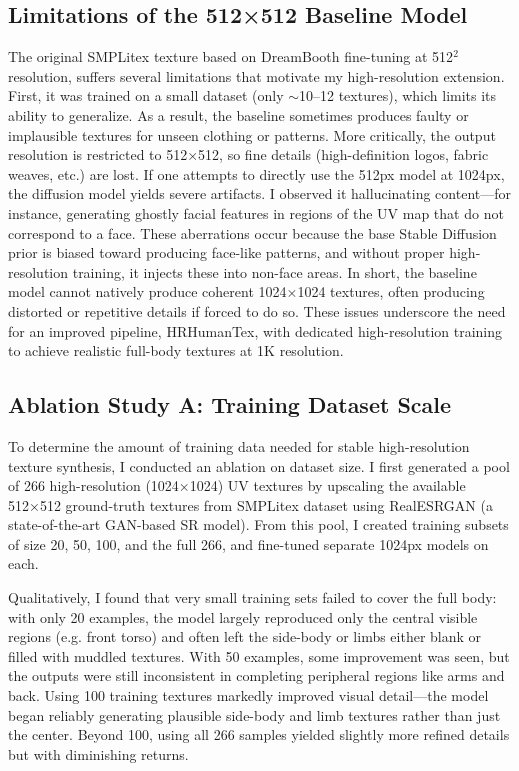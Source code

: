 \subsection{Limitations of the 512×512 Baseline Model}
The original SMPLitex texture based on DreamBooth fine-tuning at 512$^2$ resolution, suffers several limitations that motivate my high-resolution extension. First, it was trained on a small dataset (only $\sim$10–12 textures), which limits its ability to generalize. As a result, the baseline sometimes produces faulty or implausible textures for unseen clothing or patterns. More critically, the output resolution is restricted to 512×512, so fine details (high-definition logos, fabric weaves, etc.) are lost. If one attempts to directly use the 512px model at 1024px, the diffusion model yields severe artifacts. I observed it hallucinating content—for instance, generating ghostly facial features in regions of the UV map that do not correspond to a face. These aberrations occur because the base Stable Diffusion prior is biased toward producing face-like patterns, and without proper high-resolution training, it injects these into non-face areas. In short, the baseline model cannot natively produce coherent 1024×1024 textures, often producing distorted or repetitive details if forced to do so. These issues underscore the need for an improved pipeline, HRHumanTex, with dedicated high-resolution training to achieve realistic full-body textures at 1K resolution.


\subsection{Ablation Study A: Training Dataset Scale}
To determine the amount of training data needed for stable high-resolution texture synthesis, I conducted an ablation on dataset size. I first generated a pool of 266 high-resolution (1024×1024) UV textures by upscaling the available 512×512 ground-truth textures from SMPLitex dataset using RealESRGAN\cite{wang2021realesrgan} (a state-of-the-art GAN-based SR model). From this pool, I created training subsets of size 20, 50, 100, and the full 266, and fine-tuned separate 1024px models on each. 

Qualitatively, I found that very small training sets failed to cover the full body: with only 20 examples, the model largely reproduced only the central visible regions (e.g. front torso) and often left the side-body or limbs either blank or filled with muddled textures. With 50 examples, some improvement was seen, but the outputs were still inconsistent in completing peripheral regions like arms and back. Using 100 training textures markedly improved visual detail—the model began reliably generating plausible side-body and limb textures rather than just the center. Beyond 100, using all 266 samples yielded slightly more refined details but with diminishing returns. 

